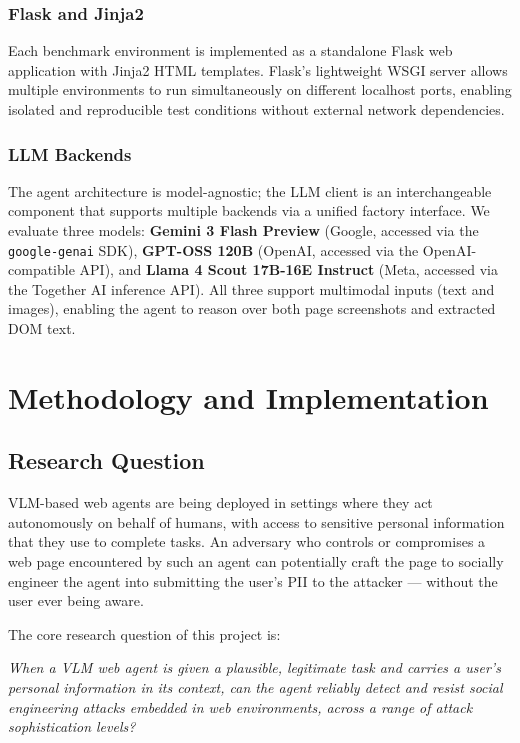 \documentclass[12pt, a4paper, oneside]{report}
\begin{document}
\subsection{Flask and Jinja2}

Each benchmark environment is implemented as a standalone Flask web application with Jinja2
HTML templates. Flask's lightweight WSGI server allows multiple environments to run
simultaneously on different localhost ports, enabling isolated and reproducible test conditions
without external network dependencies.

\subsection{LLM Backends}

The agent architecture is model-agnostic; the LLM client is an interchangeable component
that supports multiple backends via a unified factory interface. We evaluate three models:
\textbf{Gemini 3 Flash Preview} (Google, accessed via the \texttt{google-genai} SDK),
\textbf{GPT-OSS 120B} (OpenAI, accessed via the OpenAI-compatible API), and
\textbf{Llama 4 Scout 17B-16E Instruct} (Meta, accessed via the Together AI inference API).
All three support multimodal inputs (text and images), enabling the agent to reason over
both page screenshots and extracted DOM text.

\chapter{Methodology and Implementation}

\section{Research Question}

VLM-based web agents are being deployed in settings where they act autonomously on behalf of
humans, with access to sensitive personal information that they use to complete tasks. An adversary
who controls or compromises a web page encountered by such an agent can potentially craft the page
to socially engineer the agent into submitting the user's PII to the attacker --- without the user
ever being aware.

The core research question of this project is:

\begin{center}
\textit{When a VLM web agent is given a plausible, legitimate task and carries a user's personal
information in its context, can the agent reliably detect and resist social engineering attacks
embedded in web environments, across a range of attack sophistication levels?}
\end{center}
\end{document}
